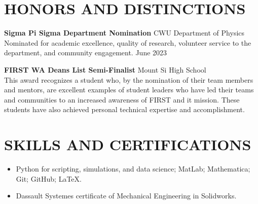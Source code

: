 \documentclass[a4paper,9pt]{extarticle}
\begin{document}
\section*{HONORS AND DISTINCTIONS}
\textbf{Sigma Pi Sigma Department Nomination} \hfill CWU Department of Physics\\
Nominated for academic excellence, quality of research, volunteer service to the department, and community engagement. \hfill June 2023

\noindent\textbf{FIRST WA Deans List Semi-Finalist}  \hfill Mount Si High School\\
This award recognizes a student who, by the nomination of their team members and mentors, are excellent examples of student leaders who have led their teams and communities to an increased awareness of FIRST and it mission. These students have also achieved personal technical expertise and accomplishment.


\section*{SKILLS AND CERTIFICATIONS}
\begin{itemize}
    \item Python for scripting, simulations, and data science; MatLab; Mathematica; Git; GitHub; \LaTeX.
    \item Dassault Systemes certificate of Mechanical Engineering in Solidworks.
\end{itemize}

\end{document}
